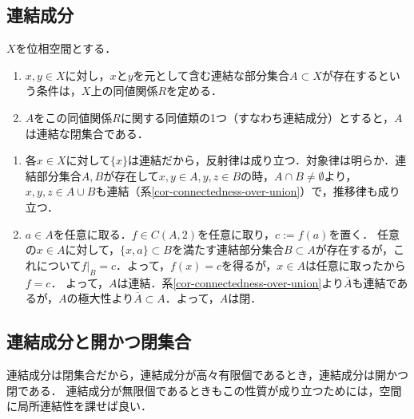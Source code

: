 \documentclass[uplatex,dvipdfmx]{jsreport}
\begin{document}
\subsection{連結成分}

\begin{proposition}[連結成分は閉集合]\label{prop-connected-component}
    $X$を位相空間とする．
    \begin{enumerate}
        \item $x,y\in X$に対し，$x$と$y$を元として含む連結な部分集合$A\subset X$が存在するという条件は，$X$上の同値関係$R$を定める．
        \item $A$をこの同値関係$R$に関する同値類の1つ（すなわち連結成分）とすると，$A$は連結な閉集合である．
    \end{enumerate}
\end{proposition}
\begin{Proof}\mbox{}
    \begin{enumerate}
        \item 各$x\in X$に対して$\{x\}$は連結だから，反射律は成り立つ．対象律は明らか．連結部分集合$A,B$が存在して$x,y\in A,y,z\in B$の時，$A\cap B\ne\emptyset$より，$x,y,z\in A\cup B$も連結（系\ref{cor-connectedness-over-union}）で，推移律も成り立つ．
        \item $a\in A$を任意に取る．$f\in C(A,2)$を任意に取り，$c:=f(a)$を置く．
        任意の$x\in A$に対して，$\{x,a\}\subset B$を満たす連結部分集合$B\subset A$が存在するが，これについて$f|_B=c$．よって，$f(x)=c$を得るが，$x\in A$は任意に取ったから$f=c$．
        よって，$A$は連結．系\ref{cor-connectedness-over-union}より$\overline{A}$も連結であるが，$A$の極大性より$\overline{A}\subset A$．よって，$A$は閉．
    \end{enumerate}
\end{Proof}

\subsection{連結成分と開かつ閉集合}

\begin{tcolorbox}[colframe=ForestGreen, colback=ForestGreen!10!white,breakable,colbacktitle=ForestGreen!40!white,coltitle=black,fonttitle=\bfseries\sffamily,
title=]
    連結成分は閉集合だから，連結成分が高々有限個であるとき，連結成分は開かつ閉である．
    連結成分が無限個であるときもこの性質が成り立つためには，空間に局所連結性を課せば良い．
\end{tcolorbox}
\end{document}
